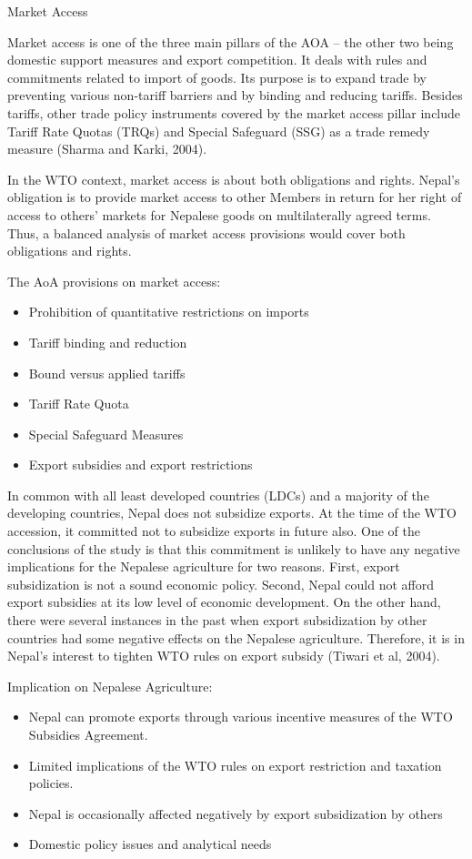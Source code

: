 \documentclass[
  openany]{book}
\providecommand{\tightlist}{%
  \setlength{\itemsep}{0pt}\setlength{\parskip}{0pt}}
\begin{document}
Market Access

Market access is one of the three main pillars of the AOA -- the other two being domestic support measures and export competition. It deals with rules and commitments related to import of goods. Its purpose is to expand trade by preventing various non-tariff barriers and by binding and reducing tariffs. Besides tariffs, other trade policy instruments covered by the market access pillar include Tariff Rate Quotas (TRQs) and Special Safeguard (SSG) as a trade remedy measure (Sharma and Karki, 2004).

In the WTO context, market access is about both obligations and rights. Nepal's obligation is to provide market access to other Members in return for her right of access to others' markets for Nepalese goods on multilaterally agreed terms. Thus, a balanced analysis of market access provisions would cover both obligations and rights.

The AoA provisions on market access:

\begin{itemize}
\tightlist
\item
  Prohibition of quantitative restrictions on imports
\item
  Tariff binding and reduction
\item
  Bound versus applied tariffs
\item
  Tariff Rate Quota
\item
  Special Safeguard Measures
\item
  Export subsidies and export restrictions
\end{itemize}

In common with all least developed countries (LDCs) and a majority of the developing countries, Nepal does not subsidize exports. At the time of the WTO accession, it committed not to subsidize exports in future also. One of the conclusions of the study is that this commitment is unlikely to have any negative implications for the Nepalese agriculture for two reasons. First, export subsidization is not a sound economic policy. Second, Nepal could not afford export subsidies at its low level of economic development. On the other hand, there were several instances in the past when export subsidization by other countries had some negative effects on the Nepalese agriculture. Therefore, it is in Nepal's interest to tighten WTO rules on export subsidy (Tiwari et al, 2004).

Implication on Nepalese Agriculture:

\begin{itemize}
\tightlist
\item
  Nepal can promote exports through various incentive measures of the WTO Subsidies Agreement.
\item
  Limited implications of the WTO rules on export restriction and taxation policies.
\item
  Nepal is occasionally affected negatively by export subsidization by others
\item
  Domestic policy issues and analytical needs
\end{itemize}
\end{document}
